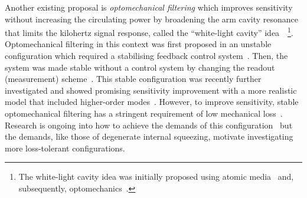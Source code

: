 Another existing proposal is \emph{optomechanical filtering} which improves sensitivity without increasing the circulating power by broadening the arm cavity resonance that limits the kilohertz signal response, called the ``white-light cavity'' idea~\cite{miaoEnhancingBandwidthGravitationalWave2015}~\footnote{The white-light cavity idea was initially proposed using atomic media~\cite{WICHT1997431} and, subsequently, optomechanics~\cite{Qin:15}.}. %
Optomechanical filtering in this context was first proposed in an unstable configuration which required a stabilising feedback control system~\cite{miaoEnhancingBandwidthGravitationalWave2015}. %
Then, the system was made stable without a control system by changing the readout (measurement) scheme~\cite{liBroadbandSensitivityImprovement2020}. This stable configuration was recently further investigated and showed promising sensitivity improvement with a more realistic model that included higher-order modes~\cite{liEnhancingInterferometerSensitivity2021}. 
However, to improve sensitivity, stable optomechanical filtering has a stringent requirement of low mechanical loss~\cite{miaoEnhancingBandwidthGravitationalWave2015,liBroadbandSensitivityImprovement2020}. Research is ongoing into how to achieve the demands of this configuration~\cite{ying_2020,pageEnhancedDetectionHigh2018} but the demands, like those of degenerate internal squeezing, motivate investigating more loss-tolerant configurations. 

